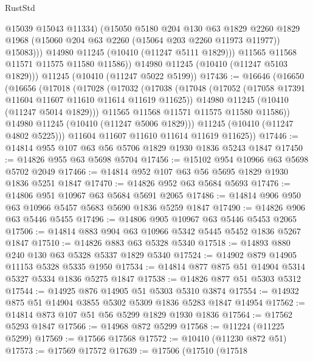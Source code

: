 \begin{lexlean}{RustStd}
\begin{coremodule}
                  @15039
                  @15043
                  @11334)
                (@15050
                  @5180
                  @204
                  @130
                  @63
                  @1829
                  @2260
                  @1829
                  @1968
                  (@15060 @204 @63 @2260 (@15064 @203 @2260 @11973 @11977))
                  @15083)))
            @14980
            @11245
            (@10410 (@11247 @5111 @1829)))
          @11565
          @11568
          @11571
          @11575
          @11580
          @11586))
      @14980
      @11245
      (@10410 (@11247 @5103 @1829)))
    @11245
    (@10410 (@11247 @5022 @5199))
@17436 := @16646
    (@16650
      (@16656
        (@17018
          (@17028
            (@17032
              (@17038
                (@17048
                  (@17052 (@17058 @17391 @11604 @11607 @11610 @11614 @11619 @11625))
                  @14980
                  @11245
                  (@10410 (@11247 @5014 @1829)))
                @11565
                @11568
                @11571
                @11575
                @11580
                @11586))
            @14980
            @11245
            (@10410 (@11247 @5006 @1829)))
          @11245
          (@10410 (@11247 @4802 @5225)))
        @11604
        @11607
        @11610
        @11614
        @11619
        @11625))
@17446 := @14814 @955 @107 @63 @56 @5706 @1829 @1930 @1836 @5243 @1847
@17450 := @14826 @955 @63 @5698 @5704
@17456 := @15102 @954 @10966 @63 @5698 @5702 @2049
@17466 := @14814 @952 @107 @63 @56 @5695 @1829 @1930 @1836 @5251 @1847
@17470 := @14826 @952 @63 @5684 @5693
@17476 := @14806 @951 @10967 @63 @5684 @5691 @2065
@17486 := @14814 @906 @950 @63 @10966 @5457 @5683 @5690 @1836 @5259 @1847
@17490 := @14826 @906 @63 @5446 @5455
@17496 := @14806 @905 @10967 @63 @5446 @5453 @2065
@17506 := @14814 @883 @904 @63 @10966 @5342 @5445 @5452 @1836 @5267 @1847
@17510 := @14826 @883 @63 @5328 @5340
@17518 := @14893 @880 @240 @130 @63 @5328 @5337 @1829 @5340
@17524 := @14902 @879 @14905 @11153 @5328 @5335 @1950
@17534 := @14814 @877 @875 @51 @14904 @5314 @5327 @5334 @1836 @5275 @1847
@17538 := @14826 @877 @51 @5303 @5312
@17544 := @14925 @876 @14905 @51 @5303 @5310 @3874
@17554 := @14932 @875 @51 @14904 @3855 @5302 @5309 @1836 @5283 @1847 @14954
@17562 := @14814 @873 @107 @51 @56 @5299 @1829 @1930 @1836
@17564 := @17562 @5293 @1847
@17566 := @14968 @872 @5299
@17568 := @11224 (@11225 @5299)
@17569 := @17566 @17568
@17572 := @10410 (@11230 @872 @51)
@17573 := @17569 @17572
@17639 := @17506
    (@17510
      (@17518

\end{coremodule}
\end{lexlean}
